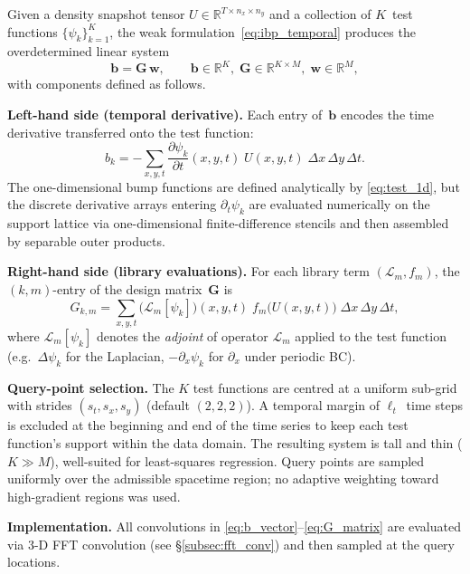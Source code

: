 Given a density snapshot tensor $U\in\mathbb{R}^{T\times n_x\times n_y}$
and a collection of $K$~test functions $\{\psi_k\}_{k=1}^K$, the weak
formulation~\eqref{eq:ibp_temporal} produces the overdetermined linear
system
\begin{equation}
  \mathbf{b} = \mathbf{G}\,\mathbf{w},
  \qquad
  \mathbf{b}\in\mathbb{R}^K,\;
  \mathbf{G}\in\mathbb{R}^{K\times M},\;
  \mathbf{w}\in\mathbb{R}^M,
  \label{eq:weak_system}
\end{equation}
with components defined as follows.

\noindent\textbf{Left-hand side (temporal derivative).}
Each entry of~$\mathbf{b}$ encodes the time derivative transferred
onto the test function:
\begin{equation}
  b_k = -\sum_{x,y,t}
    \frac{\partial\psi_k}{\partial t}(x,y,t)\;
    U(x,y,t)\;
    \Delta x\,\Delta y\,\Delta t.
  \label{eq:b_vector}
\end{equation}
The one-dimensional bump functions are defined analytically by
\eqref{eq:test_1d}, but the discrete derivative arrays entering
$\partial_t\psi_k$ are evaluated numerically on the support lattice via
one-dimensional finite-difference stencils and then assembled by
separable outer products.

\noindent\textbf{Right-hand side (library evaluations).}
For each library term $(\mathcal{L}_m,f_m)$, the $(k,m)$-entry of the
design matrix~$\mathbf{G}$ is
\begin{equation}
  G_{k,m}
  = \sum_{x,y,t}
    \bigl(\mathcal{L}_m[\psi_k]\bigr)(x,y,t)\;
    f_m\!\bigl(U(x,y,t)\bigr)\;
    \Delta x\,\Delta y\,\Delta t,
  \label{eq:G_matrix}
\end{equation}
where $\mathcal{L}_m[\psi_k]$ denotes the \emph{adjoint} of operator
$\mathcal{L}_m$ applied to the test function (e.g.\ $\Delta\psi_k$ for
the Laplacian, $-\partial_x\psi_k$ for $\partial_x$ under periodic BC).

\noindent\textbf{Query-point selection.}
The $K$ test functions are centred at a uniform sub-grid with strides
$(s_t,s_x,s_y)$ (default $(2,2,2)$).  A temporal margin
of $\ell_t$~time steps is excluded at the beginning and end of the
time series to keep each test function's support within the data domain.
The resulting system is tall and thin ($K\gg M$), well-suited for
least-squares regression.  Query points are sampled uniformly over the admissible spacetime region; no adaptive weighting toward high-gradient regions was used.

\noindent\textbf{Implementation.}
All convolutions in \eqref{eq:b_vector}--\eqref{eq:G_matrix} are
evaluated via 3-D FFT convolution (see \S\ref{subsec:fft_conv})
and then sampled at the query locations.

